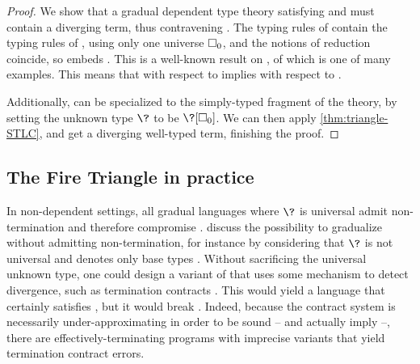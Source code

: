 \begin{proof}
  We show that a gradual dependent type theory satisfying  and 
  must contain a diverging term, thus contravening .
  The typing rules of  contain the typing rules of ,
  using only one universe $\uni[0]$,
  and the notions of reduction coincide, so  embeds
  . This is a well-known result on  , of which  is one of many examples.
  This means that  with respect to  implies 
  with respect to .

  Additionally,  can be specialized to the simply-typed fragment of the theory,
  by setting the unknown type $\?$ to be $\?[\uni[0]]$.
  We can then apply \cref{thm:triangle-STLC},
  and get a diverging well-typed term, finishing the proof.
\end{proof}

\subsection{The Fire Triangle in practice}

In non-dependent settings, all gradual languages where $\?$ is universal
admit non-termination and therefore compromise .
 discuss the possibility to gradualize 
without admitting non-termination, for instance by considering that $\?$ is not universal
and denotes only base types%
.
Without sacrificing the universal unknown type, one could design a variant of 
that uses some mechanism to detect divergence, such as termination contracts
. This would yield a language that certainly satisfies
, but it would break . Indeed, because the contract system is
necessarily under-approximating in order to be sound – and actually imply  –,
there are effectively-terminating programs with imprecise variants that yield termination
contract errors.

